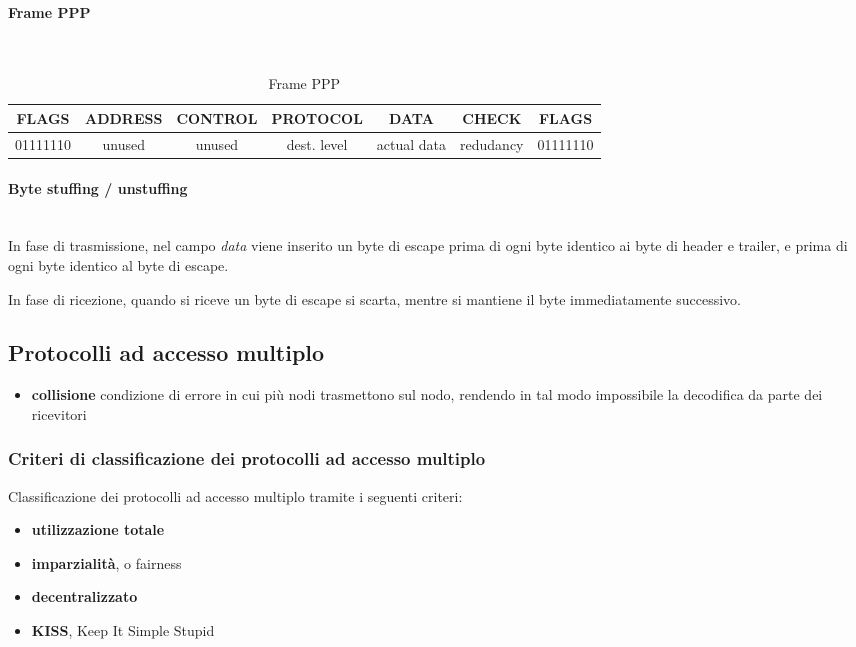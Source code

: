 \documentclass[12pt,a4paper]{article}
\begin{document}
\paragraph{Frame PPP}\mbox{}\\
\begin{table}[H]
  \centering
  \begin{tabular}{| c | c | c | c | c | c | c |} \hline
    FLAGS    & ADDRESS  & CONTROL & PROTOCOL    & DATA        & CHECK     & FLAGS    \\ \hline
    01111110 & unused   & unused  & dest. level & actual data & redudancy & 01111110 \\ \hline
  \end{tabular}
  \caption{Frame PPP}
\end{table}

\paragraph{Byte stuffing / unstuffing}\mbox{}\\
In fase di trasmissione, nel campo \emph{data} viene inserito un byte di
escape prima di ogni byte identico ai byte di header e trailer, e prima
di ogni byte identico al byte di escape.

In fase di ricezione, quando si riceve un byte di escape si scarta, mentre
si mantiene il byte immediatamente successivo.

\subsection{Protocolli ad accesso multiplo}
\begin{itemize}
  \item \textbf{collisione} condizione di errore in cui più nodi trasmettono
  sul nodo, rendendo in tal modo impossibile la decodifica da parte dei
  ricevitori
\end{itemize}

\subsubsection{Criteri di classificazione dei protocolli ad accesso multiplo}
Classificazione dei protocolli ad accesso multiplo tramite i seguenti criteri:
\begin{itemize}
  \item \textbf{utilizzazione totale}
  \item \textbf{imparzialità}, o fairness
  \item \textbf{decentralizzato}
  \item \textbf{KISS}, Keep It Simple Stupid
\end{itemize}
\end{document}
